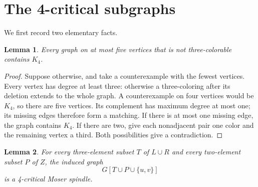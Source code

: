 \documentclass[11pt]{article}
\newtheorem{lemma}{Lemma}
\begin{document}
\section{The 4-critical subgraphs}

We first record two elementary facts.

\begin{lemma}\label{lem:five}
Every graph on at most five vertices that is not three-colorable
contains $K_4$.
\end{lemma}

\begin{proof}
Suppose otherwise, and take a counterexample with the fewest
vertices. Every vertex has degree at least three: otherwise a
three-coloring after its deletion extends to the whole graph.
A counterexample on four vertices would be $K_4$, so there are
five vertices. Its complement has maximum degree at most one;
its missing edges therefore form a matching. If there is at
most one missing edge, the graph contains $K_4$. If there are two, give each
nonadjacent pair one color and the remaining vertex a third.
Both possibilities give a contradiction.
\end{proof}

\begin{lemma}\label{lem:spindles}
For every three-element subset $T$ of $L\cup R$ and every
two-element subset $P$ of $Z$, the induced graph
\[
 G[T\cup P\cup\{u,v\}]
\]
is a 4-critical Moser spindle.
\end{lemma}
\end{document}
